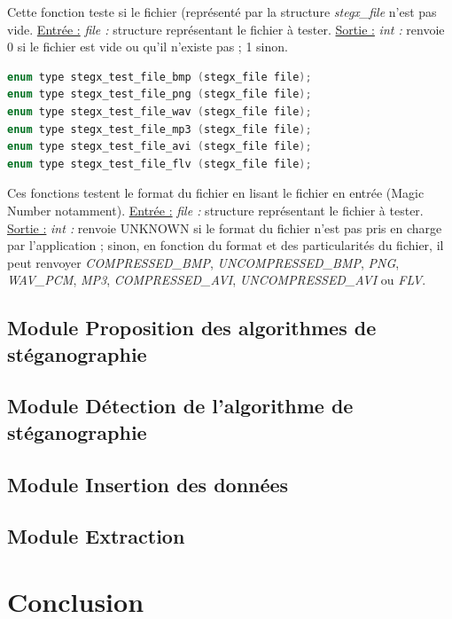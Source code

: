 \documentclass[11pt]{article}
\begin{document}
Cette fonction teste si le fichier (représenté par la structure \textit{stegx\_file}
n'est pas vide. 
\newline
\underline{Entrée :} \newline
\textit{file :} structure représentant le fichier à tester. \newline
\underline{Sortie :} \newline
\textit{int :} renvoie 0 si le fichier est vide ou qu'il n'existe pas ; 1 sinon. 
\newline 

\begin{lstlisting}[language=c]
enum type stegx_test_file_bmp (stegx_file file);
enum type stegx_test_file_png (stegx_file file);
enum type stegx_test_file_wav (stegx_file file);
enum type stegx_test_file_mp3 (stegx_file file);
enum type stegx_test_file_avi (stegx_file file);
enum type stegx_test_file_flv (stegx_file file);
\end{lstlisting}

Ces fonctions testent le format du fichier en lisant le fichier en entrée 
(Magic Number notamment). 
\newline
\underline{Entrée :} \newline
\textit{file :} structure représentant le fichier à tester. \newline
\underline{Sortie :} \newline
\textit{int :} renvoie UNKNOWN si le format du fichier n'est pas pris en 
charge par l'application ; sinon, en fonction du format et des particularités 
du fichier, il peut renvoyer \textit{COMPRESSED\_BMP}, \textit{UNCOMPRESSED\_BMP}, 
\textit{PNG}, \textit{WAV\_PCM}, \textit{MP3}, \textit{COMPRESSED\_AVI}, 
\textit{UNCOMPRESSED\_AVI} ou \textit{FLV}. 
\newline 

\subsection{Module Proposition des algorithmes 
de stéganographie}
\subsection{Module Détection de l'algorithme de
stéganographie}
\subsection{Module Insertion des données}
\subsection{Module Extraction}

\section{Conclusion}
\end{document}
